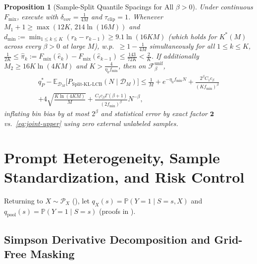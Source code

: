 \documentclass{article}
\theoremstyle{plain}
\newtheorem{proposition}{Proposition}
\theoremstyle{definition}
\theoremstyle{remark}
\newcommand{\E}{\mathbb{E}}
\newcommand{\Prob}{\mathbb{P}}
\newcommand{\Fmix}{F_{\mathrm{mix}}}
\begin{document}
\begin{proposition}[Sample-Split Quantile Spacings for All $\beta > 0$]
\label{prop:spacings}
Under continuous $\Fmix$, execute  with $\delta_{\mathrm{cov}} = \frac{1}{4M}$ and $\tau_{\mathrm{clip}} = 1$. Whenever $M_1 + 1 \ge \max(12 K,\, 214\ln(16M))$ and $d_{\min} := \min_{1\le k\le K}(r_k - r_{k-1}) \ge 9.1\ln(16KM)$ (which holds for $K^*(M)$ across every $\beta > 0$ at large $M$), w.p.\ $\ge 1 - \frac{1}{4M}$ simultaneously for all $1 \le k \le K$, $\frac{1}{2K} \le \hat{\pi}_k := \Fmix(\hat{e}_k) - \Fmix(\hat{e}_{k-1}) \le \frac{143}{72 K} < \frac{2}{K}$. If additionally $M_2 \ge 16 K\ln(4KM)$ and $K > \frac{4}{\eta_0 f_{\min}}$, then on $\mathcal{F}_\beta^{\mathrm{unif}}$,
\begin{multline}
q^*_P - \E_{\mathcal{D}_M}\big[P_{\mathrm{Split\text{-}KL\text{-}LCB}}(N \mid \mathcal{D}_M)\big]
\le \frac{1}{M} + e^{-\eta_0 f_{\min} N} + \frac{2^\beta C_1 c_\beta}{(K f_{\min})^\beta} \\
+ 4\sqrt{\frac{K\ln(4KM)}{M}} + \frac{C_1 c_\beta\Gamma(\beta+1)}{(2 f_{\min})^\beta}N^{-\beta},
\end{multline}
inflating bin bias by at most $2^\beta$ and statistical error by exact factor $\mathbf{2}$ vs.\ \eqref{eq:joint-upper} using zero external unlabeled samples.
\end{proposition}

\section{Prompt Heterogeneity, Sample Standardization, and Risk Control}
\label{sec:heterogeneity}

Returning to $X \sim \mathcal{P}_X$ (), let $q_X(s) = \Prob(Y=1 \mid S=s, X)$ and $q_{\mathrm{pool}}(s) = \Prob(Y=1 \mid S=s)$ (proofs in ).

\subsection{Simpson Derivative Decomposition and Grid-Free Masking}
\end{document}
